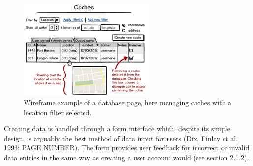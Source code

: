 \begin{figure}[h!]
	\begin{center}
	\includegraphics[width=0.6\textwidth]{images/caches_wireframe}
	\caption{Wireframe example of a database page, here managing caches with a location filter selected.}
	\label{caches_wireframe}
	\end{center}
\end{figure}

Creating data is handled through a form interface which, despite its simple design, is arguably the best method of data input for users (Dix, Finlay et al, 1993: PAGE NUMBER). The form provides user feedback for incorrect or invalid data entries in the same way as creating a user account would (see section 2.1.2).
